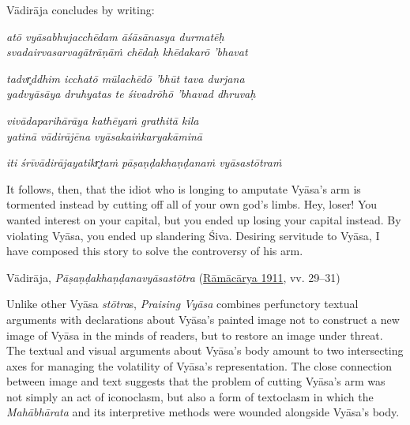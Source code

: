 Vādirāja concludes by writing: 

\begin{pullquote}\raggedright
      \emph{atō vyāsabhujacchēdam āśāsānasya durmatēḥ}\\
\emph{svadairvasarvagātrāṇāṁ chēdaḥ khēdakarō ’bhavat}

\emph{tadvr̥ddhim icchatō mūlachēdō ’bhūt tava durjana}\\
\emph{yadvyāsāya druhyatas te śivadrōhō ’bhavad dhruvaḥ}

\emph{vivādaparihārāya kathēyaṁ grathitā kila}\\
\emph{yatinā vādirājēna vyāsakaiṅkaryakāminā}

	\emph{iti śrīvādirājayatikr̥taṁ pāṣaṇḍakhaṇḍanaṁ vyāsastōtraṁ}\\

\end{pullquote}
      
\begin{pullquote}
It follows, then, that the idiot who is longing to amputate Vyāsa’s arm is tormented instead by cutting off all of your own god’s limbs. Hey, loser! You wanted interest on your capital, but you ended up losing your capital instead. By violating Vyāsa, you ended up slandering Śiva. Desiring servitude to Vyāsa, I have composed this story to solve the controversy of his arm.


\medskip\hfill\begin{minipage}{0.9\textwidth}\small\hfill
Vādirāja, \emph{{Pāṣaṇḍakhaṇḍanavyāsastōtra}} (\hyperref[VP]{Rāmācārya 1911}, vv. 29–31)\end{minipage}\hspace{2em}
\end{pullquote}

Unlike other Vyāsa \emph{stōtra}s, \emph{Praising Vyāsa} combines perfunctory textual arguments with declarations about Vyāsa’s painted image not to construct a new image of Vyāsa in the minds of readers, but to restore an image under threat. The textual and visual arguments about Vyāsa’s body amount to two intersecting axes for managing the volatility of Vyāsa’s representation. The close connection between image and text suggests that the problem of cutting Vyāsa’s arm was not simply an act of iconoclasm, but also a form of textoclasm in which the \emph{Mahābhārata} and its interpretive methods were wounded alongside Vyāsa’s body. 

